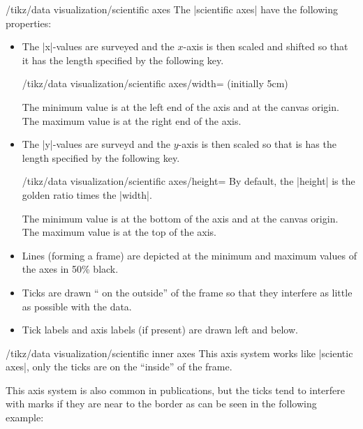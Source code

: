 \begin{key}{/tikz/data visualization/scientific axes}
  The |scientific axes| have the following properties:
  \begin{itemize}
  \item The |x|-values are surveyed and the $x$-axis is then scaled
    and shifted so  that it has the length specified by the following key.
    \begin{key}{/tikz/data visualization/scientific
        axes/width= (initially 5cm)} 
    \end{key}
    The minimum value is at the left end of the axis and at the canvas
    origin. The maximum value is at the right end of the axis.
  \item The |y|-values are surveyd and the $y$-axis is then scaled so
    that is has the length specified by the following key.
    \begin{key}{/tikz/data visualization/scientific
        axes/height=} 
      By default, the |height| is the golden ratio times the |width|.
    \end{key}
    The minimum value is at the bottom of the axis and at the canvas
    origin. The maximum value is at the top of the axis.
  \item Lines (forming a frame) are depicted at the minimum and
    maximum values of the axes in 50\% black.
  \item Ticks are drawn `` on the outside'' of the frame so that they
    interfere as little as possible with the data.
  \item Tick labels and axis labels (if present) are drawn left and
    below. 
  \end{itemize}
\end{key}

\begin{key}{/tikz/data visualization/scientific inner axes}
  This axis system works like |scientic axes|, only the ticks are on
  the ``inside'' of the frame. 
      
\begin{codeexample}[]
\end{codeexample}

  This axis system is also common in publications, but the ticks tend
  to interfere with marks if they are near to the border as can be
  seen in the following example:
\begin{codeexample}[]
\end{codeexample}

\end{key}


